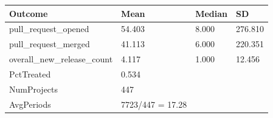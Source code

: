 
\begin{tabular}{llll}
\toprule
Outcome & Mean & Median & SD\\
\midrule
pull\_request\_opened & 54.403 & 8.000 & 276.810\\
pull\_request\_merged & 41.113 & 6.000 & 220.351\\
overall\_new\_release\_count & 4.117 & 1.000 & 12.456\\
\midrule
PctTreated & 0.534 &  &  \\
NumProjects & 447 &  &  \\
AvgPeriods & 7723/447 = 17.28 &  &  \\
\bottomrule
\end{tabular}
